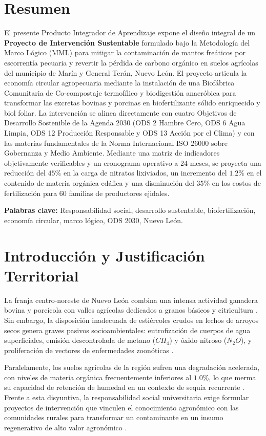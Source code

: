 \section*{Resumen}
El presente Producto Integrador de Aprendizaje expone el diseño integral de un \textbf{Proyecto de Intervención Sustentable} formulado bajo la Metodología del Marco Lógico (MML) para mitigar la contaminación de mantos freáticos por escorrentía pecuaria y revertir la pérdida de carbono orgánico en suelos agrícolas del municipio de Marín y General Terán, Nuevo León. El proyecto articula la economía circular agropecuaria mediante la instalación de una Biofábrica Comunitaria de Co-compostaje termofílico y biodigestión anaeróbica para transformar las excretas bovinas y porcinas en biofertilizante sólido enriquecido y biol foliar. La intervención se alinea directamente con cuatro Objetivos de Desarrollo Sostenible de la Agenda 2030 (ODS 2 Hambre Cero, ODS 6 Agua Limpia, ODS 12 Producción Responsable y ODS 13 Acción por el Clima) y con las materias fundamentales de la Norma Internacional ISO 26000 sobre Gobernanza y Medio Ambiente. Mediante una matriz de indicadores objetivamente verificables y un cronograma operativo a 24 meses, se proyecta una reducción del $45\%$ en la carga de nitratos lixiviados, un incremento del $1.2\%$ en el contenido de materia orgánica edáfica y una disminución del $35\%$ en los costos de fertilización para 60 familias de productores ejidales.

\vspace{0.4cm}
\noindent\textbf{Palabras clave:} Responsabilidad social, desarrollo sustentable, biofertilización, economía circular, marco lógico, ODS 2030, Nuevo León.

\section{Introducción y Justificación Territorial}
La franja centro-noreste de Nuevo León combina una intensa actividad ganadera bovina y porcícola con valles agrícolas dedicados a granos básicos y citricultura \parencite{ocdeMexico2013, semarnat2020}. Sin embargo, la disposición inadecuada de estiércoles crudos en lechos de arroyos secos genera graves pasivos socioambientales: eutrofización de cuerpos de agua superficiales, emisión descontrolada de metano ($CH_4$) y óxido nitroso ($N_2O$), y proliferación de vectores de enfermedades zoonóticas \parencite{cantumartinez2020}.

Paralelamente, los suelos agrícolas de la región sufren una degradación acelerada, con niveles de materia orgánica frecuentemente inferiores al $1.0\%$, lo que merma su capacidad de retención de humedad en un contexto de sequía recurrente \parencite{ocdeMexico2024}. Frente a esta disyuntiva, la responsabilidad social universitaria exige formular proyectos de intervención que vinculen el conocimiento agronómico con las comunidades rurales para transformar un contaminante en un insumo regenerativo de alto valor agronómico \parencite{alfaro2019, onuIndicadores}.


